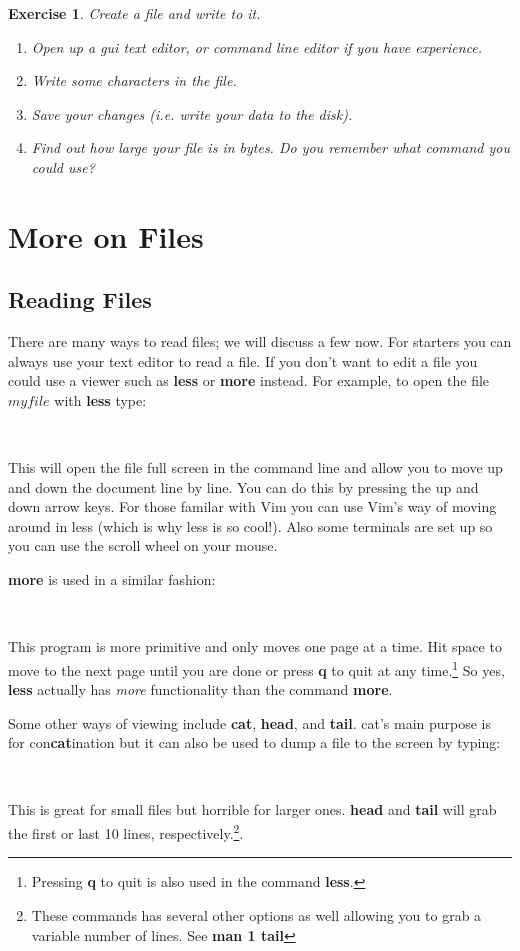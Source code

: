 \documentclass[oneside]{book}
\newcommand{\commandline}[1]{\begin{center} \colorbox{Dark}{\textcolor{white}{#1}} \end{center}}
\newtheorem{ex}{Exercise}[chapter]
\begin{document}
\begin{ex} Create a file and write to it.
    \begin{enumerate}
        \item Open up a gui text editor, or command line editor if you have experience.
        \item Write some characters in the file.
        \item Save your changes (i.e. write your data to the disk).
        \item Find out how large your file is in bytes. Do you remember what command you could use?
    \end{enumerate}
    
\end{ex}

\section{More on Files}

\subsection{Reading Files}
	There are many ways to read files; we will discuss a few now. For starters you can always use your text editor to read a file. If you don't want to edit a file you could use a viewer such as \textbf{less} or \textbf{more} instead.
	For example, to open the file $myfile$ with \textbf{less} type:
\commandline{less myfile}
This will open the file full screen in the command line and allow you to move up and down the document line by line. You can do this by pressing the up and down arrow keys. For those familar with Vim you can use Vim's way of moving around in less (which is why less is so cool!). Also some terminals are set up so you can use the scroll wheel on your mouse. 


\textbf{more} is used in a similar fashion:
\commandline{more myfile}
This program is more primitive and only moves one page at a time. Hit space to move to the next page until you are done or press \textbf{q} to quit at any time.\footnote{Pressing \textbf{q} to quit is also used in the command \textbf{less}.} So yes,  \textbf{less} actually has \textit{more} functionality than the command \textbf{more}. 

Some other ways of viewing include \textbf{cat}, \textbf{head}, and \textbf{tail}. cat's main purpose is for con\textbf{cat}ination but it can also be used to dump a file to the screen by typing:
\commandline{cat myfile}
This is great for small files but horrible for larger ones. \textbf{head} and \textbf{tail} will grab the first or last 10 lines, respectively.\footnote{These commands has several other options as well allowing you to grab a variable number of lines. See \textbf{man 1 tail}}.\\
\end{document}
